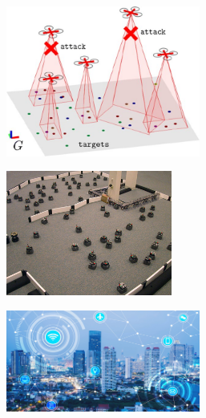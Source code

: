 \documentclass[12pt,a4paper,openright,twoside]{book}
\begin{document}
\begin{figure}[t]
    \begin{subfigure}[b]{0.49\textwidth}
        \centering
        \includegraphics[width=0.7\textwidth]{figures/swarm2.jpeg}
    \end{subfigure}
    \begin{subfigure}[b]{0.49\textwidth}
        \centering
        \includegraphics[width=0.6\textwidth]{figures/swarm3.jpeg}
    \end{subfigure}
    \begin{subfigure}[b]{0.49\textwidth}
        \centering
        \includegraphics[width=0.7\textwidth]{figures/smartcity2.jpeg}
    \end{subfigure}
    \begin{subfigure}[b]{0.49\textwidth}

\end{subfigure}
\end{figure}
\end{document}
